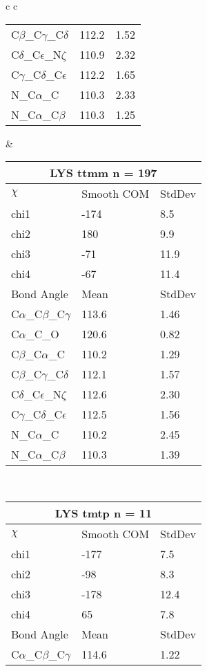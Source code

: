 \begin{longtable}{ c c }
\begin{tabular}{ l l l }
  C$\beta$\_C$\gamma$\_C$\delta$ & 112.2 & 1.52\\
  C$\delta$\_C$\epsilon$\_N$\zeta$ & 110.9 & 2.32\\
  C$\gamma$\_C$\delta$\_C$\epsilon$ & 112.2 & 1.65\\
  N\_C$\alpha$\_C & 110.3 & 2.33\\
  N\_C$\alpha$\_C$\beta$ & 110.3 & 1.25\\
  \bottomrule
  \end{tabular}
  &
  \begin{tabular}{ l l l }
  \toprule
  \multicolumn{3}{c}{LYS \textbf{ttmm} n = 197} \\ \toprule
  $\chi$       & Smooth COM & StdDev \\ \midrule
  chi1 & -174 & 8.5 \\ 
  chi2 & 180 & 9.9 \\ 
  chi3 & -71 & 11.9 \\ 
  chi4 & -67 & 11.4 \\ \midrule
  Bond Angle   & Mean     & StdDev \\ \midrule
  C$\alpha$\_C$\beta$\_C$\gamma$ & 113.6 & 1.46\\
  C$\alpha$\_C\_O & 120.6 & 0.82\\
  C$\beta$\_C$\alpha$\_C & 110.2 & 1.29\\
  C$\beta$\_C$\gamma$\_C$\delta$ & 112.1 & 1.57\\
  C$\delta$\_C$\epsilon$\_N$\zeta$ & 112.6 & 2.30\\
  C$\gamma$\_C$\delta$\_C$\epsilon$ & 112.5 & 1.56\\
  N\_C$\alpha$\_C & 110.2 & 2.45\\
  N\_C$\alpha$\_C$\beta$ & 110.3 & 1.39\\
  \bottomrule
  \end{tabular}
  \\
  \begin{tabular}{ l l l }
  \toprule
  \multicolumn{3}{c}{LYS \textbf{tmtp} n = 11} \\ \toprule
  $\chi$       & Smooth COM & StdDev \\ \midrule
  chi1 & -177 & 7.5 \\ 
  chi2 & -98 & 8.3 \\ 
  chi3 & -178 & 12.4 \\ 
  chi4 & 65 & 7.8 \\ \midrule
  Bond Angle   & Mean     & StdDev \\ \midrule
  C$\alpha$\_C$\beta$\_C$\gamma$ & 114.6 & 1.22\\

\end{tabular}
\end{longtable}
